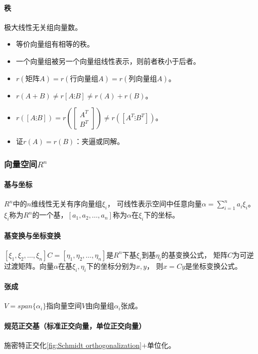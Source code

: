 \documentclass[
12pt, %
a4paper, 
oneside, %
headinclude,footinclude, %
]{scrartcl}
\begin{document}
\paragraph{秩}
极大线性无关组向量数。
\begin{itemize}
\item 等价向量组有相等的秩。
\item 一个向量组被另一个向量组线性表示，则前者秩小于后者。
\item $ r(\text{矩阵}A) = r(\text{行向量组}A) = r(\text{列向量组}A) $。
\item $ r(A + B) \neq r[A \vdots B] \neq r(A) + r(B) $。
\item $ r([A \vdots B]) = r(\begin{bmatrix} A^T \\ B^T \end{bmatrix}) \neq r([A^T \vdots B^T]) $。
\item 证$ r(A) = r(B) $：夹逼或同解。
\end{itemize}
\subsubsection{向量空间$ R^n $}
\paragraph{基与坐标}
$ R^n $中的$ n $维线性无关有序向量组$ \xi_i $，
可线性表示空间中任意向量$ \alpha = \sum_{i = 1}^n a_i \xi_i $。
$ \xi_i $称为$ R^n $的一个基，$ [a_1, a_2, \dots, a_n] $称为$ \alpha $在$ \xi_i $下的坐标。
\paragraph{基变换与坐标变换}
$ [\xi_1, \xi_2, \dots, \xi_n]C = [\eta_1, \eta_2, \dots, \eta_n] $是$ R^n $下基$ \xi_i $到基$ \eta_i $的基变换公式，
矩阵$ C $为可逆过渡矩阵。向量$ \alpha $在基$ \xi_i,\eta_i $下的坐标分别为$ x,y $，
则$ x = Cy $是坐标变换公式。
\paragraph{张成}
$ V = span\{\alpha_i\} $指向量空间$ V $由向量组$ \alpha_i $张成。
\paragraph{规范正交基（标准正交向量，单位正交向量）}
施密特正交化\vref{fig:Schmidt orthogonalization}$ + $单位化。
\end{document}
